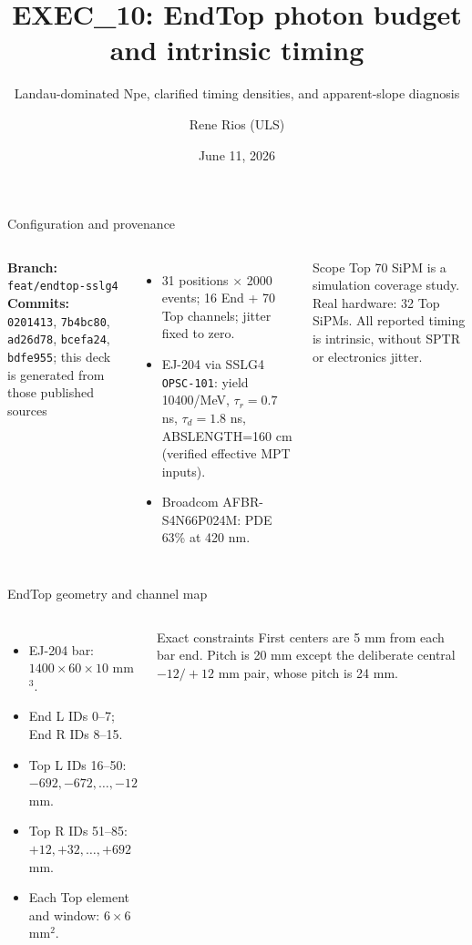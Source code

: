 \documentclass[aspectratio=169]{beamer}
\title{EXEC\_10: EndTop photon budget and intrinsic timing}
\subtitle{Landau-dominated Npe, clarified timing densities, and apparent-slope diagnosis}
\author{Rene Rios (ULS)}
\date{June 11, 2026}
\begin{document}
\begin{frame}{Configuration and provenance}

\begin{columns}[T]
\textbf{Branch:} \texttt{feat/endtop-sslg4}\\
\textbf{Commits:} \texttt{0201413}, \texttt{7b4bc80}, \texttt{ad26d78},
\texttt{bcefa24}, \texttt{bdfe955}; this deck is generated from those published sources
\begin{itemize}\small
  \item 31 positions $\times$ 2000 events; 16 End + 70 Top channels; jitter fixed to zero.
  \item EJ-204 via SSLG4 \texttt{OPSC-101}: yield 10400/MeV, $\tau_r=0.7$ ns,
        $\tau_d=1.8$ ns, ABSLENGTH=160 cm (verified effective MPT inputs).
  \item Broadcom AFBR-S4N66P024M: PDE 63\% at 420 nm.
\end{itemize}
\begin{alertblock}{Scope}
Top 70 SiPM is a simulation coverage study. Real hardware: 32 Top SiPMs.
All reported timing is intrinsic, without SPTR or electronics jitter.
\end{alertblock}
\end{columns}

\end{frame}
\begin{frame}{EndTop geometry and channel map}

\begin{columns}[T]
\begin{itemize}
 \item EJ-204 bar: $1400\times60\times10$ mm$^3$.
 \item End L IDs 0--7; End R IDs 8--15.
 \item Top L IDs 16--50: $-692,-672,\ldots,-12$ mm.
 \item Top R IDs 51--85: $+12,+32,\ldots,+692$ mm.
 \item Each Top element and window: $6\times6$ mm$^2$.
\end{itemize}
\begin{block}{Exact constraints}
First centers are 5 mm from each bar end. Pitch is 20 mm except the deliberate
central $-12/+12$ mm pair, whose pitch is 24 mm.
\end{block}
\end{columns}

\end{frame}
\end{document}
